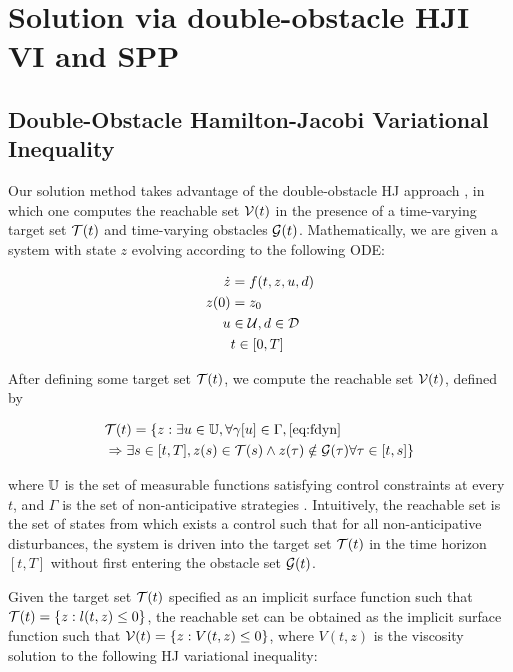 \section{Solution via double-obstacle HJI VI and SPP\label{sec:solution}}
\subsection{Double-Obstacle Hamilton-Jacobi Variational Inequality}
Our solution method takes advantage of the double-obstacle HJ approach \cite{Fisac15}, in which one computes the reachable set $\mathcal{V}(t)$ in the presence of a time-varying target set $\mathcal{T}(t)$ and time-varying obstacles $\mathcal{G}(t)$. Mathematically, we are given a system with state $z$ evolving according to the following ODE:

\begin{equation}
\label{eq:fdyn} %
\begin{aligned}
\dot{z} &= f(t, z, u, d) \\
z(0) &= z_0 \\
u &\in \cset, d \in \dset \\
&t \in [0, T]
\end{aligned}
\end{equation}

After defining some target set $\mathcal{T}(t)$, we compute the reachable set $\mathcal{V}(t)$, defined by

\begin{equation}
\begin{aligned}
&\mathcal{T}(t) = \{z: \exists u \in \mathbb{U}, \forall \gamma[u] \in \Gamma, \eqref{eq:fdyn} \\
&\Rightarrow \exists s \in [t, T], z(s) \in \mathcal{T}(s) \wedge z(\tau) \notin \mathcal{G}(\tau) \forall \tau \in [t, s]\}
\end{aligned}
\end{equation}

\noindent where $\mathbb{U}$ is the set of measurable functions satisfying control constraints at every $t$, and $\Gamma$ is the set of non-anticipative strategies \cite{Mitchell05}. Intuitively, the reachable set is the set of states from which exists a control such that for all non-anticipative disturbances, the system is driven into the target set $\mathcal{T}(t)$ in the time horizon $[t, T]$ without first entering the obstacle set $\mathcal{G}(t)$.

Given the target set $\mathcal{T}(t)$ specified as an implicit surface function such that $\mathcal{T}(t) = \{z: l(t, z) \le 0\}$, the reachable set can be obtained as the implicit surface function such that $\mathcal{V}(t) = \{z: V(t, z) \le 0\}$, where $V(t, z)$ is the viscosity solution \cite{Crandall83} to the following HJ variational inequality:

